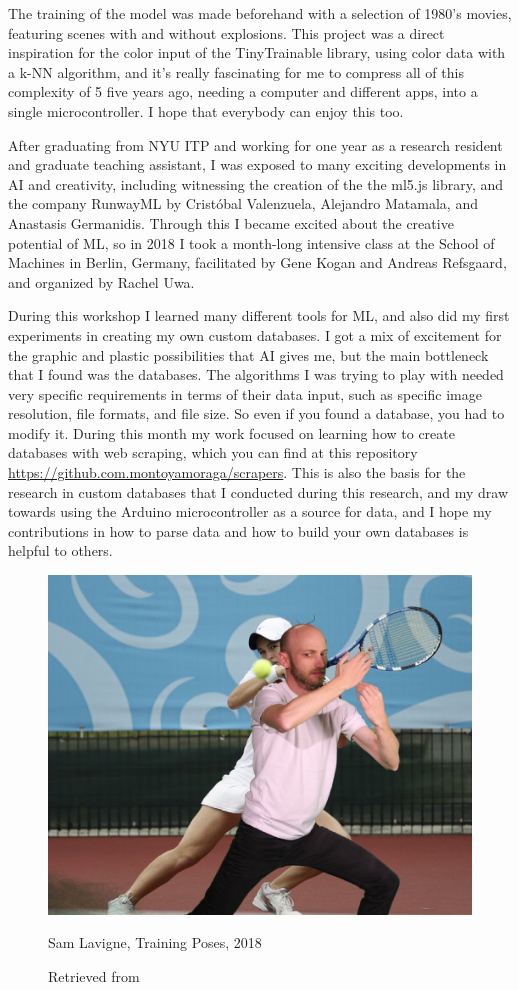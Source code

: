 The training of the model was made beforehand with a selection of 1980's movies, featuring scenes with and without explosions. This project was a direct inspiration for the color input of the TinyTrainable library, using color data with a \acrshort{k-NN} algorithm, and it's really fascinating for me to compress all of this complexity of 5 five years ago, needing a computer and different apps, into a single microcontroller. I hope that everybody can enjoy this too.

After graduating from \acrshort{NYU} \acrshort{ITP} and working for one year as a research resident and graduate teaching assistant, I was exposed to many exciting developments in \acrshort{AI} and creativity, including witnessing the creation of the the ml5.js library, and the company RunwayML by Cristóbal Valenzuela, Alejandro Matamala, and Anastasis Germanidis. Through this I became excited about the creative potential of \acrshort{ML}, so in 2018 I took a month-long intensive class at the School of Machines in Berlin, Germany, facilitated by Gene Kogan and Andreas Refsgaard, and organized by Rachel Uwa.

During this workshop I learned many different tools for \acrshort{ML}, and also did my first experiments in creating my own custom databases. I got a mix of excitement for the graphic and plastic possibilities that \acrshort{AI} gives me, but the main bottleneck that I found was the databases. The algorithms I was trying to play with needed very specific requirements in terms of their data input, such as specific image resolution, file formats,  and file size. So even if you found a database, you had to modify it. During this month my work focused on learning how to create databases with web scraping, which you can find at this repository \url{https://github.com.montoyamoraga/scrapers}. This is also the basis for the research in custom databases that I conducted during this research, and my draw towards using the Arduino microcontroller as a source for data, and I hope my contributions in how to parse data and how to build your own databases is helpful to others.


\begin{figure}[ht]
  \centering
    \includegraphics[width=0.75\linewidth,height=0.25\textheight,keepaspectratio]{images/sam-lavigne-training-poses.jpg}
  \caption{Sam Lavigne, Training Poses, 2018}
  \caption*{Retrieved from \cite{website-sam-lavigne-training-poses}}
  \label{fig:sam-lavigne-training-poses}
\end{figure}

